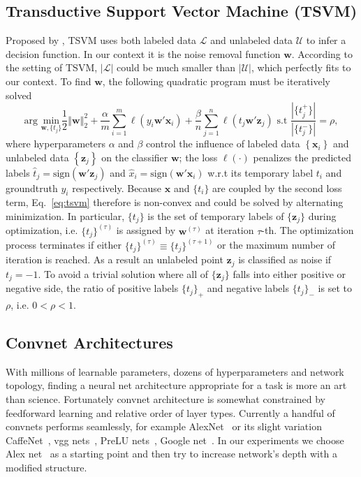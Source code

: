 \documentclass[preprint,12pt]{elsarticle}
\begin{document}
\subsection{Transductive Support Vector Machine (TSVM)}
\noindent Proposed by \cite{DBLP:conf/sigir/SindhwaniK06}, TSVM uses both labeled data  $\mathcal{L}$ and unlabeled data $\mathcal{U}$ to infer a decision function. In our context it is the noise removal function $\mathbf{w}$. According to the setting of TSVM, $|\mathcal{L}|$ could be much smaller than $|\mathcal{U}|$, which perfectly fits to our context. To find  $\mathbf{w}$, the following quadratic program must be iteratively solved
\begin{equation}
\text{arg }\underset{\mathbf{w},\{t_j\}}{\text{min}} \frac{1}{2} \left\Vert \mathbf{w} \right\Vert_2^2 + \frac{\alpha}{m} \sum_{i=1}^m \ell(y_i \mathbf{w}' \mathbf{x}_i) + \frac{\beta}{n} \sum_{j=1}^n \ell(t_j \mathbf{w}' \mathbf{z}_j) \text{ s.t } \frac{|\{t_j^+\}|}{|\{t_j^-\}|}=\rho,
\label{eq:tsvm}
\end{equation} where hyperparameters $\alpha$ and $\beta$ control the influence of labeled data $\left \{{\mathbf{x}_i}\right \}$ and unlabeled data $\left \{{\mathbf{z}_j}\right \}$ on the classifier $\mathbf{w}$; the loss $\ell(\cdot)$ penalizes the predicted labels $\hat{t}_j = \text{sign}(\mathbf{w}' \mathbf{z}_j)$ and $\hat{x}_i = \text{sign}(\mathbf{w}' \mathbf{x}_i)$ w.r.t its temporary label $t_i$ and groundtruth $y_i$ respectively. Because $\mathbf{x}$ and $\{ t_i \}$ are coupled by the second loss term, Eq.~\ref{eq:tsvm} therefore is non-convex and could be solved by alternating minimization. In particular, $\{t_j\}$ is the set of temporary labels of $\{ \mathbf{z}_j \}$ during optimization, i.e. $\{t_j\}^{(\tau)}$ is assigned by $\mathbf{w}^{(\tau)}$ at iteration $\tau$-th.  The optimization process terminates if either $\{ t_j \}^{(\tau)} \equiv \{ t_j \}^{(\tau+1)}$ or the maximum number of iteration is reached. As a result an unlabeled point $\mathbf{z}_j$ is classified as noise if $t_j=-1$. To avoid a  trivial solution where all of $\{\mathbf{z}_j\}$ falls into either positive or negative side, the ratio of positive labels $\{ t_j \}_+$ and negative labels $\{ t_j \}_-$ is set to $\rho$, i.e. $0<\rho<1$. 

\subsection{Convnet Architectures}\label{sec:deeper}
\noindent With millions of learnable parameters, dozens of hyperparameters and network topology, finding a neural net architecture appropriate for a task is more an art than science. Fortunately convnet architecture is somewhat constrained by feedforward learning and relative order of layer types. Currently a handful of convnets performs seamlessly, for example AlexNet~\cite{DBLP:conf/nips/KrizhevskySH12} or its slight variation CaffeNet~\cite{jia2014caffe}, vgg  nets~\cite{DBLP:journals/corr/SimonyanZ14a}, PreLU nets~\cite{he2015delving}, Google net~\cite{DBLP:journals/corr/SzegedyLJSRAEVR14}. In our experiments we choose Alex net~\cite{DBLP:conf/nips/KrizhevskySH12} as a starting point and then try to increase network's depth with a modified structure. 
\end{document}
